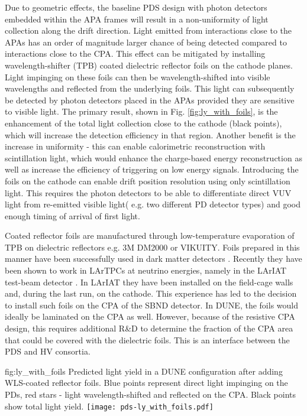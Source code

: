 Due to geometric effects, the baseline PDS design with photon detectors embedded within the APA frames will result
in a non-uniformity of light collection along the drift direction. Light emitted from interactions close to the APAs has an order of magnitude larger chance of being detected compared to interactions close to the CPA. This effect can be mitigated by installing wavelength-shifter (TPB) coated dielectric reflector foils on the cathode planes. Light impinging on these foils
can then be wavelength-shifted into visible wavelengths and reflected from the underlying foils. This light can subsequently be detected by photon detectors placed in the APAs provided they are sensitive to visible light. The primary result, 
shown in Fig. \ref{fig:ly_with_foils}, is the enhancement of the total light collection close to the cathode (black points), which will increase the detection efficiency in that region. 
Another benefit is the increase in uniformity - this can enable calorimetric reconstruction with scintillation light, which would enhance the charge-based energy reconstruction as well as increase the efficiency of triggering on low energy signals. Introducing the foils on the cathode can enable drift position resolution  using only scintillation light. This requires the photon detectors to be able to differentiate direct VUV light from re-emitted visible light( e.g. two different PD detector types) and good enough timing of arrival of first light.

Coated reflector foils are manufactured through low-temperature evaporation of TPB on dielectric reflectors e.g. 3M DM2000 or VIKUITY. Foils prepared in this manner have been successfully used in dark matter detectors \cite{warp}. Recently they have been shown to work in LArTPCs at neutrino energies, namely  in the LArIAT test-beam detector \cite{LArIAT}. In LArIAT they have been installed on the field-cage walls and, during the last run, on the cathode. This experience has led to the decision to install such foils on the CPA of the SBND detector. In DUNE, the foils would ideally be laminated on the CPA as well. However, because of the resistive CPA design, this requires additional R\&D to determine the fraction of the CPA area that could be covered with the dielectric foils.
This is an interface between the PDS and HV consortia. 

\begin{dunefigure}{fig:ly_with_foils}
{Predicted light yield in a DUNE configuration after adding WLS-coated reflector foils. Blue points represent direct light impinging on the PDs, red stars - light wavelength-shifted and reflected on the CPA. Black points show total light yield.}
\texttt{[image: pds-ly\_with\_foils.pdf]}
\end{dunefigure}

